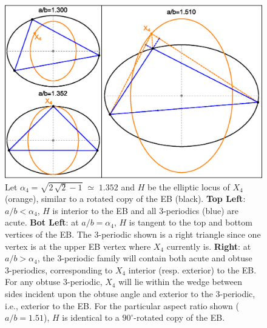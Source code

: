 \begin{figure}[H]
    \centering
    \includegraphics[width=.8\textwidth]{pics/1010_ort_loci.eps}
    \caption{Let
    $\alpha_4=\sqrt{2\,\sqrt {2}-1}\;{\simeq}\;1.352$
    and $H$ be the elliptic locus of $X_4$ (orange), similar to a rotated copy of the EB (black). \textbf{Top Left}: $a/b<\alpha_4$, $H$ is interior to the EB and all 3-periodics (blue) are acute. \textbf{Bot Left}: at $a/b=\alpha_4$, $H$ is tangent to the top and bottom vertices of the EB. The 3-periodic shown is a right triangle since one vertex is at the upper EB vertex where $X_4$ currently is. \textbf{Right}: at $a/b>\alpha_4$, the 3-periodic family will contain both acute and obtuse 3-periodics, corresponding to $X_4$ interior (resp. exterior) to the EB. For any obtuse 3-periodic, $X_4$ will lie within the wedge between sides incident upon the obtuse angle and exterior to the 3-periodic, i.e., exterior to the EB. For the particular aspect ratio shown ($a/b=1.51$), $H$ is identical to a $90^{\circ}$-rotated copy of the EB.}
    \label{fig:orthocenter_loci}
\end{figure}

